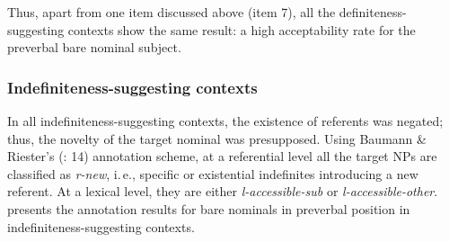 \documentclass[output=paper]{langsci/langscibook}
\begin{document}
Thus, apart from one item discussed above (item 7), all the definiteness-sugges\-ting contexts show the same result: a high acceptability rate for the preverbal bare nominal subject.

\subsubsection{Indefiniteness-suggesting contexts}\label{2sec:342}

In all indefiniteness-suggesting contexts, the existence of referents was negated; thus, the novelty of the target nominal was presupposed. Using Baumann \& Riester's (\citeyear{baumann:riester:12}: 14) annotation scheme, at a referential level all the target NPs are classified as {\emph{r-new}}, i.\,e., specific or existential indefinites introducing a new referent. At a lexical level, they are either {\emph{l-accessible-sub}} or {\emph{l-accessible-other}}.  presents the annotation results for bare nominals in preverbal position in indefiniteness-suggesting contexts.

\begin{table}
\caption{Annotation of target nominals in indefiniteness-suggesting contexts}\label{2table:2}
\end{table}
\end{document}
